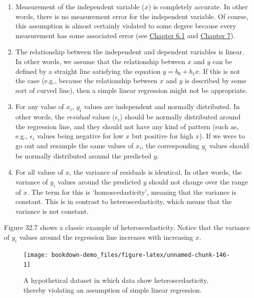 \documentclass[
  openany]{krantz}
\begin{document}
\begin{enumerate}
\def\labelenumi{\arabic{enumi}.}
\item
  Measurement of the independent variable (\(x\)) is completely accurate. In other words, there is no measurement error for the independent variable.
  Of course, this assumption is almost certainly violated to some degree because every measurement has some associated error (see \protect\hyperlink{accuracy}{Chapter 6.1} and \protect\hyperlink{Chapter_7}{Chapter 7}).
\item
  The relationship between the independent and dependent variables is linear.
  In other words, we assume that the relationship between \(x\) and \(y\) can be defined by a straight line satisfying the equation \(y = b_{0} + b_{1}x\).
  If this is not the case (e.g., because the relationship between \(x\) and \(y\) is described by some sort of curved line), then a simple linear regression might not be appropriate.
\item
  For any value of \(x_{i}\), \(y_{i}\) values are independent and normally distributed.
  In other words, the \emph{residual} values (\(\epsilon_{i}\)) should be normally distributed around the regression line, and they should not have any kind of pattern (such as, e.g., \(\epsilon_{i}\) values being negative for low \(x\) but positive for high \(x\)).
  If we were to go out and resample the same values of \(x_{i}\), the corresponding \(y_{i}\) values should be normally distributed around the predicted \(y\).
\item
  For all values of \(x\), the variance of residuals is identical.
  In other words, the variance of \(y_{i}\) values around the predicted \(y\) should not change over the range of \(x\).
  The term for this is `homoscedasticity', meaning that the variance is constant.
  This is in contrast to heteroscedasticity, which means that the variance is not constant.
\end{enumerate}

Figure 32.7 shows a classic example of heteroscedasticity.
Notice that the variance of \(y_{i}\) values around the regression line increases with increasing \(x\).

\begin{figure}
\texttt{[image: bookdown-demo\_files/figure-latex/unnamed-chunk-146-1]} \caption{A hypothetical dataset in which data show heteroscedasticity, thereby violating an assumption of simple linear regression.}\label{fig:unnamed-chunk-146}
\end{figure}
\end{document}

